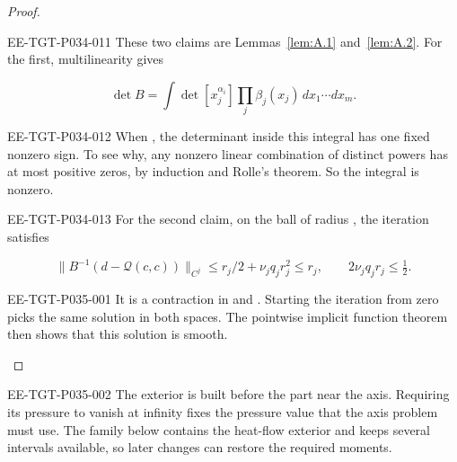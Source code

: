 \begin{proof}
\begin{EESegment}{EE-TGT-P034-011}
These two claims are Lemmas~\ref{lem:A.1} and~\ref{lem:A.2}. For the first,
multilinearity gives
\end{EESegment}
\[
  \det B=\int\det[x_j^{\alpha_i}]\prod_j\beta_j(x_j)\,dx_1\cdots dx_m.
\]
\begin{EESegment}{EE-TGT-P034-012}
When , the determinant inside this
integral has one fixed nonzero sign. To see why, any nonzero linear
combination of  distinct powers has at most
 positive zeros, by induction and Rolle's theorem.
So the integral is nonzero.
\end{EESegment}

\begin{EESegment}{EE-TGT-P034-013}
For the second claim, on the ball of radius
, the iteration
 satisfies
\end{EESegment}
\[
  \|B^{-1}(d-\mathcal Q(c,c))\|_{C^j}\leq r_j/2+\nu_jq_jr_j^2\leq r_j,
  \qquad 2\nu_jq_jr_j\leq\tfrac12.
\]
%
\begin{EESegment}{EE-TGT-P035-001}
It is a contraction in  and
. Starting the iteration from zero picks the same
solution in both spaces. The pointwise implicit function theorem then shows
that this solution is smooth.
\end{EESegment}
\end{proof}

\begin{EESegment}{EE-TGT-P035-002}
The exterior is built before the part near the axis. Requiring its pressure
to vanish at infinity fixes the pressure value that the axis problem must
use. The family below contains the heat-flow exterior and keeps several
intervals available, so later changes can restore the required moments.
\end{EESegment}

